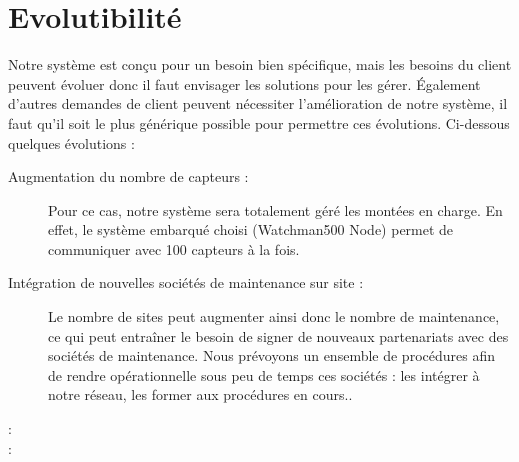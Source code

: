 \section{Evolutibilité}

Notre système est conçu pour un besoin bien spécifique, mais les besoins du client peuvent évoluer
donc il faut envisager les solutions pour les gérer.
Également d'autres demandes de client peuvent nécessiter l'amélioration de notre système, il faut qu'il soit
le plus générique possible pour permettre ces évolutions. Ci-dessous quelques évolutions :

\begin{description}
           \item[Augmentation du nombre de capteurs :] Pour ce cas, notre système sera totalement géré les montées en charge. En effet, le système embarqué choisi (Watchman500 Node) permet de communiquer avec 100 capteurs à la fois.
           \item[Intégration de nouvelles sociétés de maintenance sur site :] Le nombre de sites peut augmenter ainsi donc le nombre de maintenance, ce qui peut entraîner le besoin de signer de nouveaux partenariats avec des sociétés de maintenance. Nous prévoyons un ensemble de procédures afin de rendre opérationnelle sous peu de temps ces sociétés : les intégrer à notre réseau, les former aux procédures en cours..
           \item[ :] 
           \item[ :] 
\end{description}
